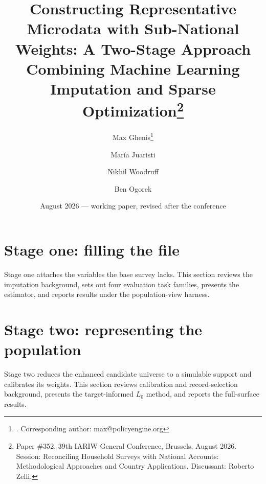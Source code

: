\documentclass[11pt]{article}
\title{Constructing Representative Microdata with Sub-National
Weights: A Two-Stage Approach Combining Machine Learning Imputation
and Sparse Optimization\thanks{Paper \#352, 39th IARIW General
Conference, Brussels, August 2026. Session: Reconciling Household
Surveys with National Accounts: Methodological Approaches and Country
Applications. Discussant: Roberto Zelli.}}
\author{
    Max Ghenis\thanks{\policyengine{}. Corresponding author:
    max@policyengine.org} \and
    María Juaristi\footnotemark[2] \and
    Nikhil Woodruff\footnotemark[2] \and
    Ben Ogorek\footnotemark[2]
}
\date{August 2026 --- working paper, revised after the conference}
\begin{document}
\maketitle





\section{Stage one: filling the file}
\label{imp:sec:stage}

Stage one attaches the variables the base survey lacks. This section reviews the imputation
background, sets out four evaluation task families, presents the estimator, and reports results
under the population-view harness.






\section{Stage two: representing the population}
\label{sp:sec:stage}

Stage two reduces the enhanced candidate universe to a simulable support and calibrates its
weights. This section reviews calibration and record-selection background, presents the
target-informed $L_0$ method, and reports the full-surface results.













\appendix




\end{document}
